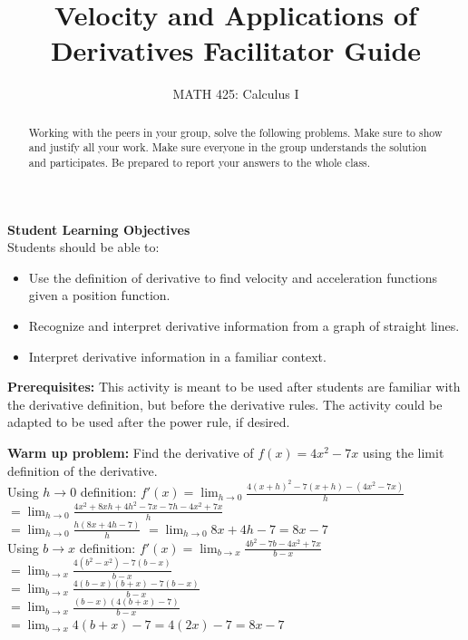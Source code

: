 \documentclass{ximera}
\title{Velocity and Applications of Derivatives Facilitator Guide}
\author{MATH 425: Calculus I}
\begin{document}
\begin{abstract}
   Working with the peers in your group, solve the following problems. Make sure to show and justify all your work. Make sure everyone in the group understands the solution and participates. Be prepared to report your answers to the whole class. 
\end{abstract}
\maketitle

\textbf{Student Learning Objectives}\\
Students should be able to:
\begin{itemize}
    \item Use the definition of derivative to find velocity and acceleration functions given a position function.
    \item Recognize and interpret derivative information from a graph of straight lines. 
    \item Interpret derivative information in a familiar context.
\end{itemize}

\textbf{Prerequisites:} This activity is meant to be used after students are familiar with the derivative definition, but before the derivative rules.  The activity could be adapted to be used after the power rule, if desired. 

\begin{exercise}
    \textbf{Warm up problem:} Find the derivative of $f(x)=4x^2-7x$ using the limit definition of the derivative.\\
        Using $h\rightarrow 0$ definition: $f'(x)=\lim_{h\rightarrow 0}\frac{4(x+h)^2-7(x+h)-(4x^2-7x)}{h}$\\
    $=\lim_{h\rightarrow 0} \frac{4x^2+8xh+4h^2-7x-7h-4x^2+7x}{h}$\\
    $=\lim_{h\rightarrow 0}\frac{h(8x+4h-7)}{h}$
    $=\lim_{h\rightarrow 0} 8x+4h-7=8x-7$\\
    
    Using $b\rightarrow x$ definition: $f'(x)=\lim_{b\rightarrow x}\frac{4b^2-7b-4x^2+7x}{b-x}$\\
    $=\lim_{b\rightarrow x} \frac{4(b^2-x^2)-7(b-x)}{b-x}$\\
    $=\lim_{b\rightarrow x} \frac{4(b-x)(b+x)-7(b-x)}{b-x}$\\
    $=\lim_{b\rightarrow x} \frac{(b-x)(4(b+x)-7)}{b-x}$\\
    $=\lim_{b\rightarrow x} 4(b+x)-7=4(2x)-7=8x-7$%
\end{exercise}
\end{document}
